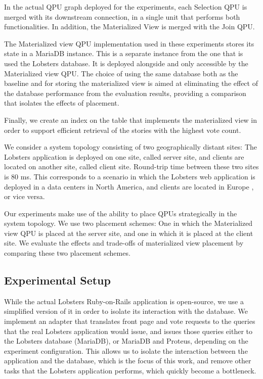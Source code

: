 In the actual QPU graph deployed for the experiments, each Selection QPU is merged with its downstream connection,
in a single unit that performs both functionalities.
In addition, the Materialized View is merged with the Join QPU.

The Materialized view QPU implementation used in these experiments stores its state in a MariaDB instance.
This is a separate instance from the one that is used the Lobsters database.
It is deployed alongside and only accessible by the Materialized view QPU.
The choice of using the same database both as the baseline and for storing the materialized view is aimed at eliminating
the effect of the database performance from the evaluation results,
providing a comparison that isolates the effects of placement.

Finally, we create an index on the table that implements the materialized view in order to support efficient retrieval of
the stories with the highest vote count.

\bigskip
\noindent
We consider a system topology consisting of two geographically distant sites:
The Lobsters application is deployed on one site, called server site,
and clients are located on another site, called client site.
Round-trip time between these two sites is 80 ms.
This corresponds to a scenario in which the Lobsters web application is deployed in a data centers in North America,
and clients are located in Europe \cite{pbailis:hats}, or vice versa.

Our experiments  make use of the ability to place QPUs strategically in the system topology.
We use two placement schemes:
One in which the Materialized view QPU is placed at the server site, and one in which it is placed at
the client site.
We evaluate the effects and trade-offs of materialized view placement by comparing these two placement schemes.


\subsection{Experimental Setup}
\label{sec:eval_setup}

While the actual Lobsters Ruby-on-Rails application is open-source,
we use a simplified version of it in order to isolate its interaction with the database.
We implement an adapter that translates front page and vote requests to the queries that the real
Lobsters application would issue, and issues those queries either to the Lobsters database (MariaDB),
or MariaDB and Proteus, depending on the experiment configuration.
This allows us to isolate the interaction between the application and the database, which is the focus of this work,
and remove other tasks that the Lobsters application performs, which quickly become a bottleneck.

